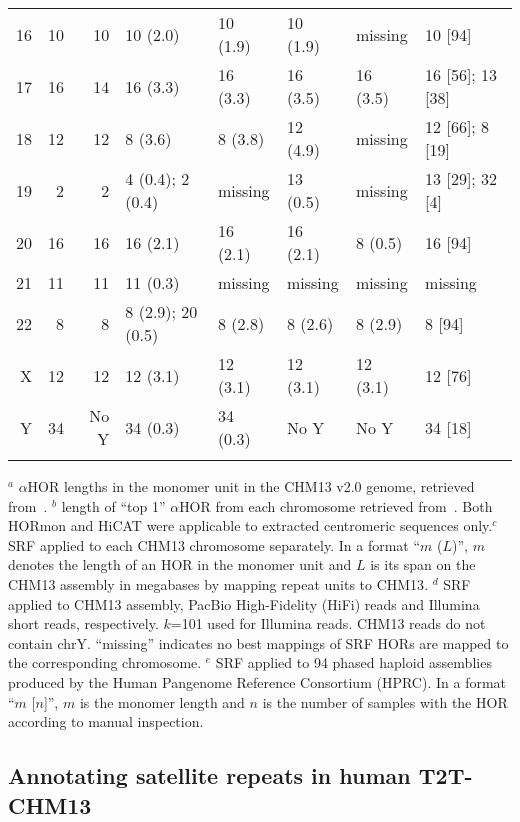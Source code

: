 \documentclass{bioinfo}
\newcommand{\revised}[1]{{\color{blue}#1}}
\begin{document}
\begin{table*}[!tb]
{\begin{tabular*}{\textwidth}{@{\extracolsep{\fill}}rrrlllll}
16 & 10 & 10 & 10 (2.0)          & 10 (1.9) & 10 (1.9) & missing  & 10 [94] \\
17 & 16 & 14 & 16 (3.3)          & 16 (3.3) & 16 (3.5) & 16 (3.5) & 16 [56]; 13 [38] \\
18 & 12 & 12 & 8 (3.6)           & 8 (3.8)  & 12 (4.9) & missing  & 12 [66]; 8 [19] \\
19 & 2  & 2  & 4 (0.4); 2 (0.4)  & missing  & 13 (0.5) & missing  & 13 [29]; 32 [4] \\
20 & 16 & 16 & 16 (2.1)          & 16 (2.1) & 16 (2.1) & 8 (0.5)  & 16 [94] \\
21 & 11 & 11 & 11 (0.3)          & missing  & missing  & missing  & missing \\
22 & 8  & 8  & 8 (2.9); 20 (0.5) & 8 (2.8)  & 8 (2.6)  & 8 (2.9)  & 8 [94] \\
X  & 12 & 12 & 12 (3.1)          & 12 (3.1) & 12 (3.1) & 12 (3.1) & 12 [76] \\
Y  & 34 &No Y& 34 (0.3)          & 34 (0.3) & No Y     & No Y     & 34 [18] \\
\botrule
\end{tabular*}
}{$^a$ $\alpha$HOR lengths in the monomer unit in the CHM13 v2.0 genome, retrieved
from~\citet{Kunyavskaya:2022tx}.  $^b$ length of ``top 1'' $\alpha$HOR from each
chromosome retrieved from~\citet{Gao2022.08.07.502881}. Both HORmon and HiCAT
were applicable to extracted centromeric sequences only.$^c$ SRF applied to
each CHM13 chromosome separately. In a format ``$m$ ($L$)'', $m$ denotes the
length of an HOR in the monomer unit and $L$ is its span on the CHM13 assembly
in megabases \revised{by mapping repeat units to CHM13}. $^d$ SRF applied to CHM13 assembly, PacBio High-Fidelity (HiFi) reads and
Illumina short reads, respectively. $k$=101 used for Illumina reads. CHM13
reads do not contain chrY. \revised{``missing'' indicates no best mappings of
SRF HORs are mapped to the corresponding chromosome.} $^e$ SRF applied to 94 phased
haploid assemblies produced by the Human Pangenome Reference Consortium (HPRC).
In a format ``$m$ [$n$]'', $m$ is the monomer length and $n$ is the number of
samples with the HOR according to manual inspection.} 
\end{table*}

\subsection{Annotating satellite repeats in human T2T-CHM13}
\end{document}
